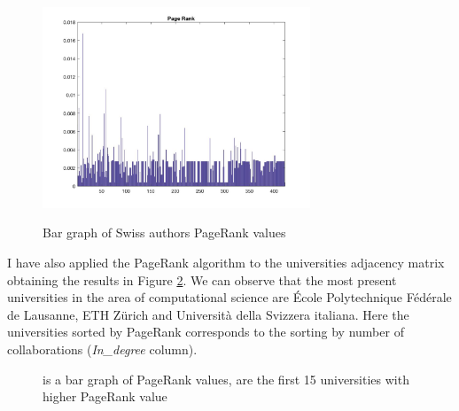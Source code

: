 \documentclass[]{usiinfbachelorproject}
\begin{document}
\begin{figure}[bt]
	\centering
	\includegraphics[height=6cm]{img/Analysis/page_rank_bars.jpg}
	\label{fig:PRbars}
	\caption{ Bar graph of Swiss authors PageRank values}
\end{figure}


I have also applied the PageRank algorithm to the universities adjacency matrix obtaining the results in Figure \ref{fig:PRUniversities}.
We can observe that the most present universities in the area of computational science are \'{E}cole Polytechnique F\'{e}d\'{e}rale de Lausanne, ETH Z\"{u}rich and Universit\`{a} della Svizzera italiana. Here the universities sorted by PageRank corresponds to the  sorting by number of collaborations (\textit{In\_degree} column).
\begin{figure}[tb]
	\centering
	\caption{  is a bar graph of PageRank values,  are the first 15 universities with higher PageRank value}
	\label{fig:PRUniversities}
\end{figure}
\end{document}
